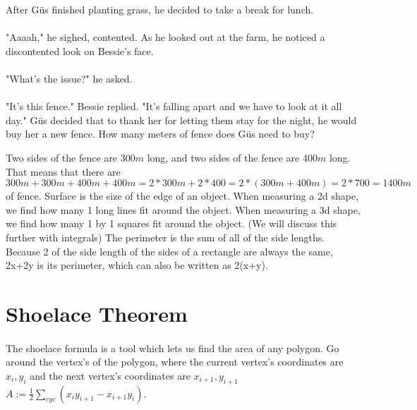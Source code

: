 {}
{After Güs finished planting grass, he decided to take a break for lunch. \paragraph{} "Aaaah," he sighed, contented. As he looked out at the farm, he noticed a discontented look on Bessie's face. \paragraph{}"What's the issue?" he asked. \paragraph{} "It's this fence." Bessie replied. "It's falling apart and we have to look at it all day." Güs decided that to thank her for letting them stay for the night, he would buy her a new fence. How many meters of fence does Güs need to buy?}
{Two sides of the fence are $300 m$ long, and two sides of the fence are $400 m$ long. That means that there are $300 m + 300 m + 400 m + 400 m = 2\ast 300 m+ 2\ast 400 = 2\ast(300 m + 400m) = 2\ast 700 = 1400 m$ of fence.}
{Surface is the size of the edge of an object. When measuring a 2d shape, we find how many 1 long lines fit around the object. When measuring a 3d shape, we find how many 1 by 1 squares fit around the object. (We will discuss this further with integrals)
The perimeter is the sum of all of the side lengths. Because 2 of the side length of the sides of a rectangle are always the same, 2x+2y is its perimeter, which can also be written as 2(x+y).}
{}
\section{Shoelace Theorem}
\paragraph{} The shoelace formula is a tool which lets us find the area of any polygon. Go around the vertex's of the polygon, where the current vertex's coordinates are $x_i, y_i$ and the next vertex's coordinates are $x_{i+1}, y_{i+1}$ \linebreak
$A:={\frac{1}{2}}\sum_{cyc} (x_iy_{i+1}-x_{i+1}y_i)$.